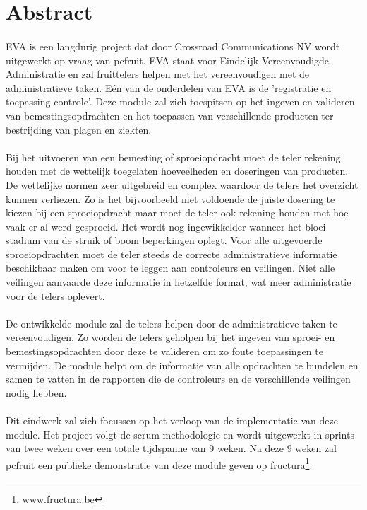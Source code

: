 \section* {Abstract}

\paragraph {} EVA is een langdurig project dat door Crossroad Communications NV wordt
uitgewerkt op vraag van pcfruit. EVA staat voor Eindelijk Vereenvoudigde Administratie en
zal fruittelers helpen met het vereenvoudigen met de administratieve taken. Eén van de
onderdelen van EVA is de 'registratie en toepassing controle'. Deze module zal zich
toespitsen op het ingeven en valideren van bemestingsopdrachten en het toepassen van
verschillende producten ter bestrijding van plagen en ziekten.

\paragraph {} Bij het uitvoeren van een bemesting of sproeiopdracht moet de teler rekening
houden met de wettelijk toegelaten hoeveelheden en doseringen van producten. De wettelijke
normen zeer uitgebreid en complex waardoor de telers het overzicht kunnen
verliezen. Zo is het bijvoorbeeld niet voldoende de juiste dosering te kiezen bij een
sproeiopdracht maar moet de teler ook rekening houden met hoe vaak er al werd gesproeid.
Het wordt nog
ingewikkelder wanneer het bloei stadium van de struik of boom beperkingen oplegt. Voor alle
uitgevoerde sproeiopdrachten moet de teler steeds de correcte administratieve informatie
beschikbaar maken om voor te leggen aan controleurs en veilingen. Niet alle veilingen
aanvaarde deze informatie in hetzelfde format, wat meer administratie voor de telers
oplevert.

\paragraph {} De ontwikkelde module zal de telers helpen door de administratieve taken te
vereenvoudigen. Zo worden de telers geholpen bij het ingeven van sproei- en
bemestingsopdrachten door deze te valideren om zo foute toepassingen te vermijden. De
module helpt om de informatie van alle opdrachten te bundelen en samen te vatten in de
rapporten die de controleurs en de verschillende veilingen nodig hebben.

\paragraph {} Dit eindwerk zal zich focussen op het verloop van de implementatie van deze
module. Het project volgt de scrum methodologie en wordt uitgewerkt in sprints van twee
weken over een totale tijdspanne van 9 weken. Na deze 9 weken zal pcfruit een publieke
demonstratie van deze module geven op fructura\footnote{www.fructura.be}.

